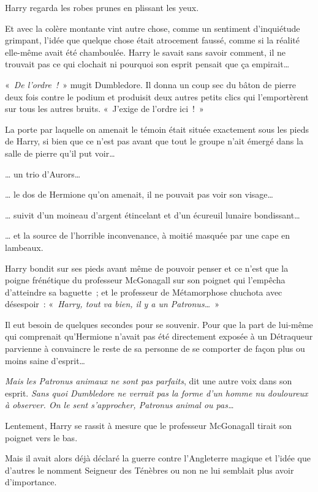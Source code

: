 Harry regarda les robes prunes en plissant les yeux.

Et avec la colère montante vint autre chose, comme un sentiment d'inquiétude grimpant, l'idée que quelque chose était atrocement faussé, comme si la réalité elle-même avait été chamboulée.
Harry le savait sans savoir comment, il ne trouvait pas ce qui clochait ni pourquoi son esprit pensait que ça empirait…

«~\emph{De l'ordre~!}~» mugit Dumbledore.
Il donna un coup sec du bâton de pierre deux fois contre le podium et produisit deux autres petits clics qui l'emportèrent sur tous les autres bruits.
«~J'exige de l'ordre ici~!~»

La porte par laquelle on amenait le témoin était située exactement sous les pieds de Harry, si bien que ce n'est pas avant que tout le groupe n'ait émergé dans la salle de pierre qu'il put voir…

… un trio d'Aurors…

… le dos de Hermione qu'on amenait, il ne pouvait pas voir son visage…

… suivit d'un moineau d'argent étincelant et d'un écureuil lunaire bondissant…

… et la source de l'horrible inconvenance, à moitié masquée par une cape en lambeaux.

Harry bondit sur ses pieds avant même de pouvoir penser et ce n'est que la poigne frénétique du professeur McGonagall sur son poignet qui l'empêcha d'atteindre sa baguette~; et le professeur de Métamorphose chuchota avec désespoir~: «~\emph{Harry, tout va bien, il y a un Patronus…}~»

Il eut besoin de quelques secondes pour se souvenir.
Pour que la part de lui-même qui comprenait qu'Hermione n'avait pas été directement exposée à un Détraqueur parvienne à convaincre le reste de sa personne de se comporter de façon plus ou moins saine d'esprit…

\emph{Mais les Patronus animaux ne sont pas parfaits}, dit une autre voix dans son esprit.
\emph{Sans quoi Dumbledore ne verrait pas la forme d'un homme nu douloureux à observer.
On le sent s'approcher, Patronus animal ou pas…}

Lentement, Harry se rassit à mesure que le professeur McGonagall tirait son poignet vers le bas.

Mais il avait alors déjà déclaré la guerre contre l'Angleterre magique et l'idée que d'autres le nomment Seigneur des Ténèbres ou non ne lui semblait plus avoir d'importance.


